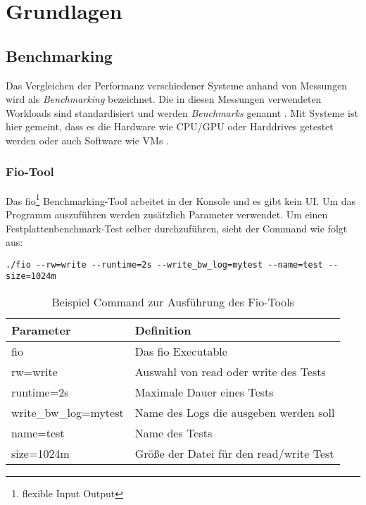 \chapter{Grundlagen}
\label{cha:Grundlagen}


\section{Benchmarking}

Das Vergleichen der Performanz verschiedener Systeme anhand von Messungen wird als \textit{Benchmarking} bezeichnet. 
Die in diesen Messungen verwendeten Workloads sind standardisiert und werden \textit{Benchmarks} genannt \cite{defi_benchmarking}.
Mit Systeme ist hier gemeint, dass es die Hardware wie CPU/GPU \cite{wang2019benchmarkingtpugpucpu} oder Harddrives \cite{ssd_benchmark} getestet werden oder auch Software 
wie VMs \cite{statistically_rigorous}.

\subsection{Fio-Tool}
Das fio\footnote{flexible Input Output} \cite{axboe} Benchmarking-Tool arbeitet in der Konsole und es gibt kein UI.
Um das Programm auszuführen werden zusätzlich Parameter verwendet.
Um einen Festplattenbenchmark-Test selber durchzuführen, sieht der Command wie folgt aus:

\begin{lstlisting}[caption=Beispiel für eine Ausführung eines fio-jobs, label={lst:job}]
  ./fio --rw=write --runtime=2s --write_bw_log=mytest --name=test --size=1024m
\end{lstlisting}


\begin{center}
  \begin{table}[h!]
    \begin{tabularx}{\textwidth}{|X|X|}
      \hline
        \textbf{Parameter}& \textbf{Definition} \\ 
      \hline
      fio & Das fio Executable  \\ 
      \hline
      rw=write & Auswahl von read oder write des Tests  \\ 
      \hline
      runtime=2s & Maximale Dauer eines Tests  \\ 
      \hline
      write\_bw\_log=mytest &  Name des Logs die ausgeben werden soll   \\ 
      \hline
      name=test &  Name des Tests   \\ 
      \hline
      size=1024m & Größe der Datei für den read/write Test    \\ 
      \hline
    \end{tabularx}
    \caption{Beispiel Command zur Ausführung des Fio-Tools}
    \label{tab:1d_1_sta}
  \end{table}
\end{center}

